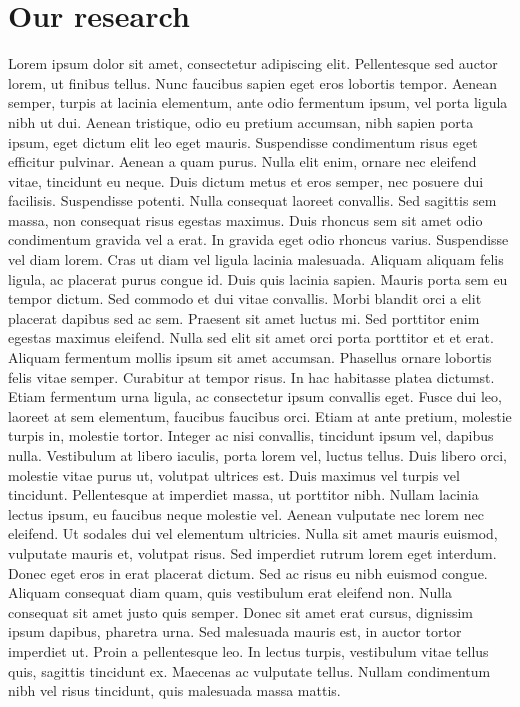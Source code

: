 \documentclass{article}
\begin{document}
\section{Our research}

Lorem ipsum dolor sit amet, consectetur adipiscing elit. Pellentesque sed auctor lorem, ut finibus tellus. Nunc faucibus sapien eget eros lobortis tempor. Aenean semper, turpis at lacinia elementum, ante odio fermentum ipsum, vel porta ligula nibh ut dui. Aenean tristique, odio eu pretium accumsan, nibh sapien porta ipsum, eget dictum elit leo eget mauris. Suspendisse condimentum risus eget efficitur pulvinar. Aenean a quam purus. Nulla elit enim, ornare nec eleifend vitae, tincidunt eu neque. Duis dictum metus et eros semper, nec posuere dui facilisis. Suspendisse potenti. Nulla consequat laoreet convallis. Sed sagittis sem massa, non consequat risus egestas maximus.
Duis rhoncus sem sit amet odio condimentum gravida vel a erat. In gravida eget odio rhoncus varius. Suspendisse vel diam lorem. Cras ut diam vel ligula lacinia malesuada. Aliquam aliquam felis ligula, ac placerat purus congue id. Duis quis lacinia sapien. Mauris porta sem eu tempor dictum. Sed commodo et dui vitae convallis. Morbi blandit orci a elit placerat dapibus sed ac sem. Praesent sit amet luctus mi. Sed porttitor enim egestas maximus eleifend. Nulla sed elit sit amet orci porta porttitor et et erat. Aliquam fermentum mollis ipsum sit amet accumsan. Phasellus ornare lobortis felis vitae semper. Curabitur at tempor risus.
In hac habitasse platea dictumst. Etiam fermentum urna ligula, ac consectetur ipsum convallis eget. Fusce dui leo, laoreet at sem elementum, faucibus faucibus orci. Etiam at ante pretium, molestie turpis in, molestie tortor. Integer ac nisi convallis, tincidunt ipsum vel, dapibus nulla. Vestibulum at libero iaculis, porta lorem vel, luctus tellus. Duis libero orci, molestie vitae purus ut, volutpat ultrices est. Duis maximus vel turpis vel tincidunt. Pellentesque at imperdiet massa, ut porttitor nibh. Nullam lacinia lectus ipsum, eu faucibus neque molestie vel. Aenean vulputate nec lorem nec eleifend. Ut sodales dui vel elementum ultricies.
Nulla sit amet mauris euismod, vulputate mauris et, volutpat risus. Sed imperdiet rutrum lorem eget interdum. Donec eget eros in erat placerat dictum. Sed ac risus eu nibh euismod congue. Aliquam consequat diam quam, quis vestibulum erat eleifend non. Nulla consequat sit amet justo quis semper. Donec sit amet erat cursus, dignissim ipsum dapibus, pharetra urna. Sed malesuada mauris est, in auctor tortor imperdiet ut. Proin a pellentesque leo. In lectus turpis, vestibulum vitae tellus quis, sagittis tincidunt ex. Maecenas ac vulputate tellus. Nullam condimentum nibh vel risus tincidunt, quis malesuada massa mattis.
\end{document}
